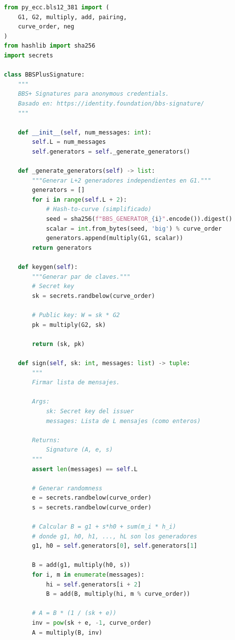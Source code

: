 \documentclass[11pt,a4paper,twoside]{book}
\theoremstyle{definition}
\theoremstyle{remark}
\begin{document}
\begin{lstlisting}[language=Python, caption={Implementación conceptual de BBS+ Signatures}]
from py_ecc.bls12_381 import (
    G1, G2, multiply, add, pairing, 
    curve_order, neg
)
from hashlib import sha256
import secrets

class BBSPlusSignature:
    """
    BBS+ Signatures para anonymous credentials.
    Basado en: https://identity.foundation/bbs-signature/
    """
    
    def __init__(self, num_messages: int):
        self.L = num_messages
        self.generators = self._generate_generators()
    
    def _generate_generators(self) -> list:
        """Generar L+2 generadores independientes en G1."""
        generators = []
        for i in range(self.L + 2):
            # Hash-to-curve (simplificado)
            seed = sha256(f"BBS_GENERATOR_{i}".encode()).digest()
            scalar = int.from_bytes(seed, 'big') % curve_order
            generators.append(multiply(G1, scalar))
        return generators
    
    def keygen(self):
        """Generar par de claves."""
        # Secret key
        sk = secrets.randbelow(curve_order)
        
        # Public key: W = sk * G2
        pk = multiply(G2, sk)
        
        return (sk, pk)
    
    def sign(self, sk: int, messages: list) -> tuple:
        """
        Firmar lista de mensajes.
        
        Args:
            sk: Secret key del issuer
            messages: Lista de L mensajes (como enteros)
        
        Returns:
            Signature (A, e, s)
        """
        assert len(messages) == self.L
        
        # Generar randomness
        e = secrets.randbelow(curve_order)
        s = secrets.randbelow(curve_order)
        
        # Calcular B = g1 + s*h0 + sum(m_i * h_i)
        # donde g1, h0, h1, ..., hL son los generadores
        g1, h0 = self.generators[0], self.generators[1]
        
        B = add(g1, multiply(h0, s))
        for i, m in enumerate(messages):
            hi = self.generators[i + 2]
            B = add(B, multiply(hi, m % curve_order))
        
        # A = B * (1 / (sk + e))
        inv = pow(sk + e, -1, curve_order)
        A = multiply(B, inv)
        

\end{lstlisting}
\end{document}
